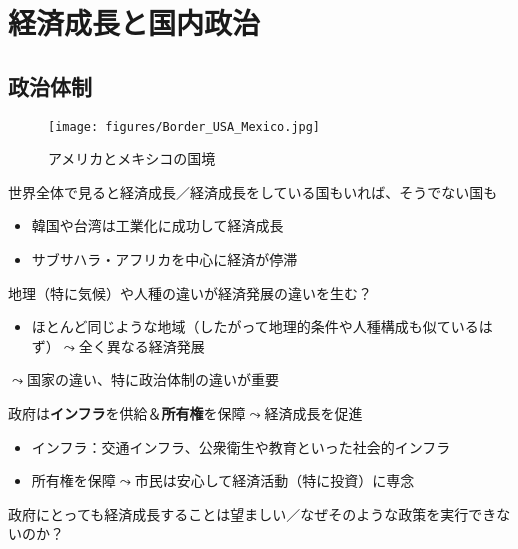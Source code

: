 \documentclass[
  xelatex,
  ja=standard]{bxjsarticle}
\providecommand{\tightlist}{%
  \setlength{\itemsep}{0pt}\setlength{\parskip}{0pt}}\usepackage{longtable,booktabs,array}
\begin{document}
\hypertarget{ux7d4cux6e08ux6210ux9577ux3068ux56fdux5185ux653fux6cbb}{%
\section{経済成長と国内政治}\label{ux7d4cux6e08ux6210ux9577ux3068ux56fdux5185ux653fux6cbb}}

\hypertarget{ux653fux6cbbux4f53ux5236}{%
\subsection{政治体制}\label{ux653fux6cbbux4f53ux5236}}

\begin{figure}[htpb]

{\centering \texttt{[image: figures/Border\_USA\_Mexico.jpg]}

}

\caption{アメリカとメキシコの国境}

\end{figure}

世界全体で見ると経済成長／経済成長をしている国もいれば、そうでない国も

\begin{itemize}
\tightlist
\item
  韓国や台湾は工業化に成功して経済成長
\item
  サブサハラ・アフリカを中心に経済が停滞
\end{itemize}

地理（特に気候）や人種の違いが経済発展の違いを生む？

\begin{itemize}
\tightlist
\item
  ほとんど同じような地域（したがって地理的条件や人種構成も似ているはず）\(\leadsto\)全く異なる経済発展
\end{itemize}

\(\leadsto\)国家の違い、特に政治体制の違いが重要\citep{robinson2006}

政府は\textbf{インフラ}を供給＆\textbf{所有権}を保障\(\leadsto\)経済成長を促進

\begin{itemize}
\tightlist
\item
  インフラ：交通インフラ、公衆衛生や教育といった社会的インフラ
\item
  所有権を保障\(\leadsto\)市民は安心して経済活動（特に投資）に専念
\end{itemize}

政府にとっても経済成長することは望ましい／なぜそのような政策を実行できないのか？
\end{document}
